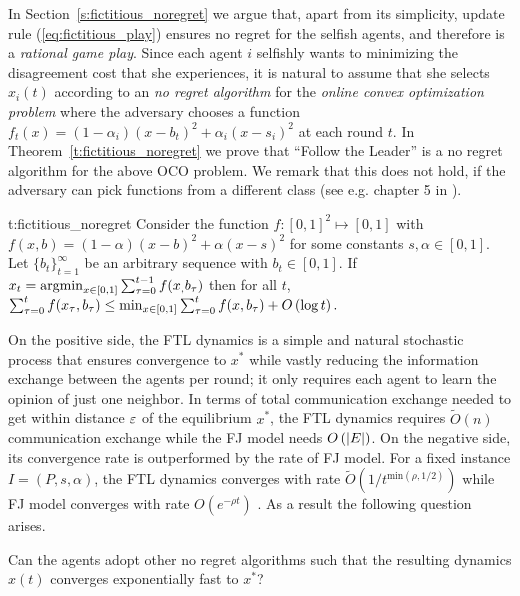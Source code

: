 In Section~\ref{s:fictitious_noregret} we argue that,
apart from its simplicity, update rule (\ref{eq:fictitious_play}) ensures
no regret for the selfish agents, and therefore is a \emph{rational game play}.
Since each agent $i$ selfishly wants to minimizing the disagreement cost
that she experiences, it is natural to assume that she selects $x_i(t)$ according to
an \emph{no regret algorithm} for the \emph{online convex optimization problem}
where the adversary chooses a function $f_t(x)=(1-\alpha_i)(x-b_t)^2 + \alpha_i(x-s_i)^2$
at each round $t$. In Theorem~\ref{t:fictitious_noregret}
we prove that \enquote{Follow the Leader} is a no regret algorithm
for the above OCO problem. We remark that this does not hold,
if the adversary can pick functions from a different class
(see e.g. chapter 5 in \cite{Haz16}).

\begin{reptheorem}{t:fictitious_noregret}
  Consider the function $f:[0,1]^2 \mapsto [0,1]$ with
  $f(x,b) = (1-\alpha)(x-b)^2 + \alpha(x-s)^2$ for some
  constants $s,\alpha \in [0,1]$.
  Let $\{b_t\}_{t=1}^\infty$ be an arbitrary sequence with
  $b_t \in [0,1]$. If $x_t = \operatorname*{argmin}_{x \in [0,1]}\sum_{\tau=0}^{t-1}f(x_,b_\tau)$
  then for all $t$,
  \(
    \sum_{\tau=0}^{t}f(x_\tau,b_\tau) \leq
    \min_{x \in [0,1]}\sum_{\tau=0}^tf(x,b_\tau) + O\left(\log t\right).
  \)
\end{reptheorem}

On the positive side, the FTL dynamics is a simple and natural
stochastic process that ensures convergence to $x^*$ while
vastly reducing the information exchange between the agents
per round; it only requires each agent to learn the opinion
of just one neighbor. In terms of total communication exchange
needed to get within distance $\varepsilon$ of the equilibrium $x^*$,
the FTL dynamics requires $\widetilde{O}(n)$ communication
exchange while the FJ model needs $O\left(|E|\right)$.
On the negative side, its convergence rate
is outperformed by the rate of FJ model.
For a fixed instance $I=(P,s,\alpha)$, the
FTL dynamics converges with rate
$\widetilde{O}(1/t^{\text{min}(\rho,1/2)})$ while FJ model
converges with rate $O(e^{-\rho t})$ \cite{GS14}.
As a result the following question arises.
\begin{question}
  Can the agents adopt other no regret algorithms such that the resulting
  dynamics $x(t)$ converges exponentially fast to $x^*$?
\end{question}

